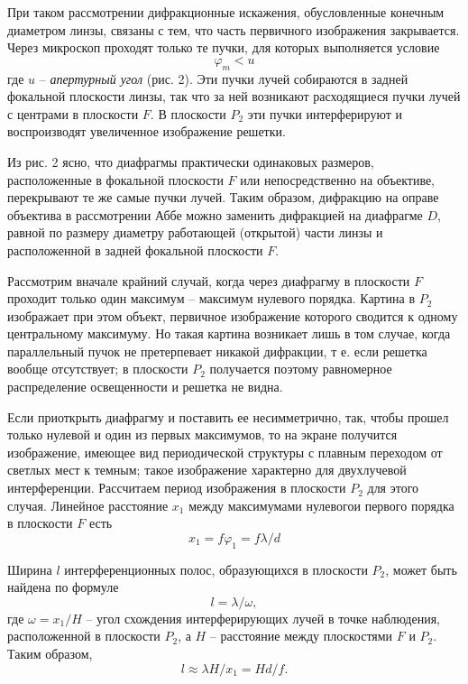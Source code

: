 \documentclass[14pt]{article}
\begin{document}
При таком рассмотрении дифракционные искажения, обусловленные
конечным диаметром линзы, связаны с тем, что часть первичного изображения
закрывается. Через микроскоп проходят только те пучки, для
которых выполняется условие
\begin{equation}
	\varphi_m < u
\end{equation}
\noindent где $u$ -- \textsl{апертурный угол} (рис. 2). Эти пучки лучей собираются в задней
фокальной плоскости линзы, так что за ней возникают расходящиеся пучки лучей с центрами в плоскости
$F$. В плоскости $P_2$ эти пучки интерферируют и воспроизводят увеличенное изображение решетки.

Из рис. 2 ясно, что диафрагмы практически одинаковых размеров, расположенные в фокальной плоскости
$F$ или непосредственно на объективе, перекрывают те же самые пучки лучей.
Таким образом, дифракцию на оправе объектива в рассмотрении Аббе можно заменить дифракцией
на диафрагме $D$, равной по размеру диаметру работающей (открытой)
части линзы и расположенной в задней фокальной плоскости $F$.

Рассмотрим вначале крайний случай, когда через диафрагму в плоскости
$F$ проходит только один максимум -- максимум нулевого порядка.
Картина в $P_2$ изображает при этом объект, первичное изображение которого
сводится к одному центральному максимуму. Но такая картина возникает лишь в том случае,
когда параллельный пучок не претерпевает никакой дифракции, т е. если решетка вообще отсутствует;
в плоскости $P_2$ получается поэтому равномерное распределение освещенности
и решетка не видна.

Если приоткрыть диафрагму и поставить ее несимметрично, так, чтобы
прошел только нулевой и один из первых максимумов, то на экране
получится изображение, имеющее вид периодической структуры с плавным
переходом от светлых мест к темным; такое изображение
характерно для двухлучевой интерференции. Рассчитаем период изображения в
плоскости $P_2$ для этого случая. Линейное расстояние $x_1$ между максимумами
нулевогои первого порядка в плоскости $F$ есть
\begin{equation}
	x_1 = f\varphi_1 = f\lambda/d
\end{equation}

Ширина $l$ интерференционных полос, образующихся в плоскости $P_2$, может
быть найдена по формуле
\begin{equation}
	l = \lambda/\omega,
\end{equation}
\noindent где $\omega = x_1/H$ -- угол схождения интерферирующих лучей в точке наблюдения,
расположенной в плоскости $P_2$, а $H$ -- расстояние между плоскостями $F$ и $P_2$. Таким образом,
\begin{equation}
	l \approx \lambda H/x_1 = Hd/f.
\end{equation}
\end{document}
